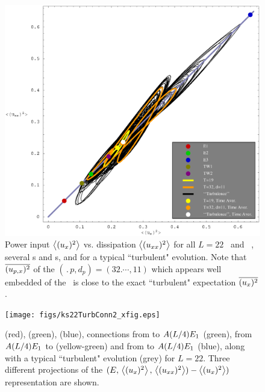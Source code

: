 \begin{figure}[t] \label{f:drivedrag}
\begin{center}
	\includegraphics[width=\textwidth]{figs/energyBalancePlot.eps}
\end{center}
\caption{
Power input $\left\langle {(u_{x})^2} \right\rangle$ vs. 
dissipation $\left\langle {(u_{xx})^2} \right\rangle$ for all $L=22$ \eqva\
and \reqva\ , several 
\po s and \rpo s, and for a typical ``turbulent"
evolution. Note that $\overline{(u_{p,x})^2}$
of the
$(\period{p},d_p) =(32.\cdots,11)$ 
 {\rpo} which appears well embedded 
of the \eqva\ is close to the exact ``turbulent"
expectation $\overline{(u_x)^2}$
.
        }
\end{figure}

\begin{figure}[t] \label{f:drivedragConn}
\begin{center}
	\texttt{[image: figs/ks22TurbConn2\_xfig.eps]}
\end{center}
\caption{
 (red),  (green),  (blue), connections from  to $A(L/4)E_{1}$ (green), 
from $A(L/4)E_{1}$ to \EQV{1} (yellow-green) and from \EQV{3} to $A(L/4)E_{1}$ (blue), along 
with a typical ``turbulent" evolution (grey) for $L=22$. Three different projections of the $(E,\, \left\langle {(u_{x})^2} \right\rangle,\, \left\langle {(u_{xx})^2} \right\rangle)-\left\langle {(u_{x})^2} \right\rangle)$
representation are shown.
        }
\end{figure}

